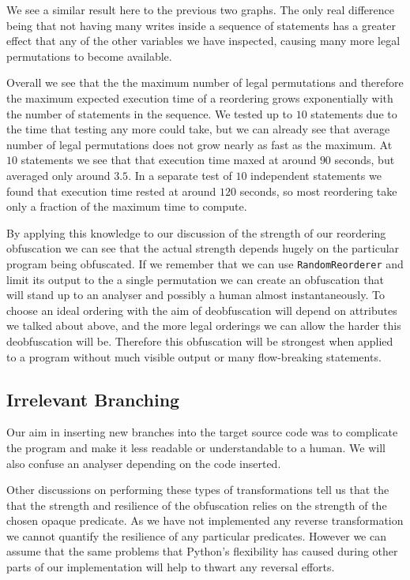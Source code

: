 \documentclass[twoside,a4paper]{report}
\begin{document}
\begin{figure}[h]
\centering
{}
\end{figure}

We see a similar result here to the previous two graphs. The only real difference being that not having many writes inside a sequence of statements
has a greater effect that any of the other variables we have inspected, causing many more legal permutations to become available.

Overall we see that the the maximum number of legal permutations and therefore the maximum expected execution time of a reordering grows exponentially
with the number of statements in the sequence. We tested up to $10$ statements due to the time that testing any more could take, but we can already see
that average number of legal permutations does not grow nearly as fast as the maximum. At $10$ statements we see that that execution time maxed at around
$90$ seconds, but averaged only around $3.5$. In a separate test of $10$ independent statements we found that execution time rested at around $120$ seconds,
so most reordering take only a fraction of the maximum time to compute.

By applying this knowledge to our discussion of the strength of our reordering obfuscation we can see that the actual strength depends hugely on the
particular program being obfuscated. If we remember that we can use \texttt{RandomReorderer} and limit its output to the a single permutation we can
create an obfuscation that will stand up to an analyser and possibly a human almost instantaneously. To choose an ideal ordering with the aim of
deobfuscation will depend on attributes we talked about above, and the more legal orderings we can allow the harder this deobfuscation will be. Therefore
this obfuscation will be strongest when applied to a program without much visible output or many flow-breaking statements.

\subsection{Irrelevant Branching}

Our aim in inserting new branches into the target source code was to complicate the program and make it less readable or understandable to a human. We will
also confuse an analyser depending on the code inserted.

Other discussions on performing these types of transformations \cite{taxobftrans} tell us that the that the strength and resilience of the obfuscation relies
on the strength of the chosen opaque predicate. As we have not implemented any reverse transformation we cannot quantify the resilience of any particular
predicates. However we can assume that the same problems that Python's flexibility has caused during other parts of our implementation will help to thwart
any reversal efforts.
\end{document}
